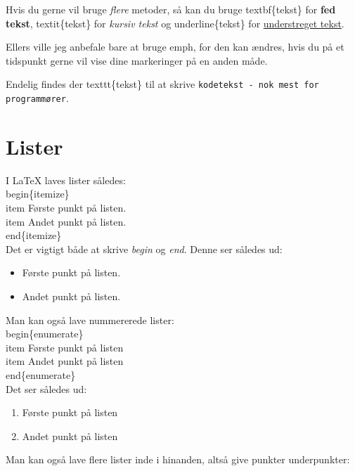 Hvis du gerne vil bruge \emph{flere} metoder, så kan du bruge \bs textbf\{tekst\} for \textbf{fed tekst}, \bs textit\{tekst\} for \textit{kursiv tekst} og \bs underline\{tekst\} for \underline{understreget tekst}.

Ellers ville jeg anbefale bare at bruge \bs emph, for den kan ændres, hvis du på et tidspunkt gerne vil vise dine markeringer på en anden måde.

Endelig findes der \bs texttt\{tekst\} til at skrive \texttt{kodetekst - nok mest for programmører}.

\section{Lister}
I LaTeX laves lister således:\\

\indent \bs begin\{itemize\}\\
\indent \bs item Første punkt på listen.\\
\indent \bs item Andet punkt på listen.\\
\indent \bs end\{itemize\}\\

\noindent
Det er vigtigt både at skrive \emph{begin} og \emph{end}. Denne ser således ud:

\begin{itemize}
\item Første punkt på listen.
\item Andet punkt på listen.
\end{itemize}

\noindent
Man kan også lave nummererede lister:\\

\indent \bs begin\{enumerate\}\\
\indent \bs item Første punkt på listen\\
\indent \bs item Andet punkt på listen\\
\indent \bs end\{enumerate\}\\

\noindent
Det ser således ud:

\begin{enumerate}
\item Første punkt på listen
\item Andet punkt på listen
\end{enumerate}

\noindent
Man kan også lave flere lister inde i hinanden, altså give punkter underpunkter:\\

